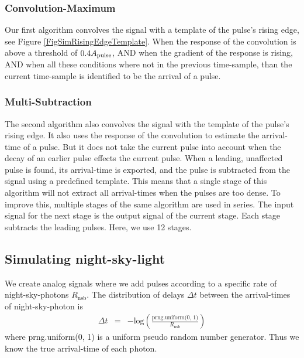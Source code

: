 \documentclass{article}%
\begin{document}
\begin{multicols}{2}
\subsubsection*{Convolution-Maximum}%
%
Our first algorithm convolves the signal with a template of the pulse's rising edge, see Figure \ref{FigSimRisingEdgeTemplate}.
%
When the response of the convolution is above a threshold of $0.4A_\text{pulse}{}$, AND when the gradient of the response is rising, AND when all these conditions where not in the previous time-sample, than the current time-sample is identified to be the arrival of a pulse.
%
\subsubsection*{Multi-Subtraction}%
%
The second algorithm also convolves the signal with the template of the pulse's rising edge. It also uses the response of the convolution to estimate the arrival-time of a pulse.
%
But it does not take the current pulse into account when the decay of an earlier pulse effects the current pulse.
%
When a leading, unaffected pulse is found, its arrival-time is exported, and the pulse is subtracted from the signal using a predefined template.
%
This means that a single stage of this algorithm will not extract all arrival-times when the pulses are too dense.
%
To improve this, multiple stages of the same algorithm are used in series.
%
The input signal for the next stage is the output signal of the current stage.
%
Each stage subtracts the leading pulses.
%
Here, we use 12 stages.
%
\subsection*{Simulating night-sky-light}%
%
We create analog signals where we add pulses according to a specific rate of night-sky-photons $R_\text{nsb}$.
%
The distribution of delays $\Delta t$ between the arrival-times of night-sky-photon is
%
\begin{eqnarray}
\Delta t &=& - \mathrm{log}\left( \frac{\text{prng.uniform(0, 1)}}{R_\text{nsb}}\right)
\end{eqnarray}
%
where prng.uniform(0, 1) is a uniform pseudo random number generator.
%
Thus we know the true arrival-time of each photon.
%

\end{multicols}
\end{document}
